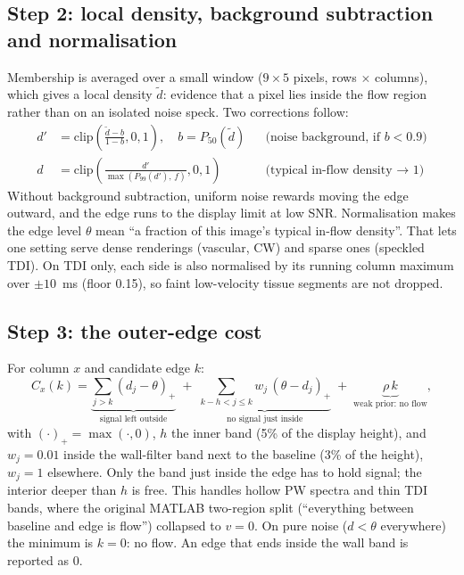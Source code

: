 \documentclass[10pt,a4paper]{article}
\begin{document}
\subsection{Step 2: local density, background subtraction and normalisation}
Membership is averaged over a small window ($9\times5$ pixels, rows $\times$ columns), which gives a local density
$\tilde d$: evidence that a pixel lies inside the flow region rather than on an isolated noise speck. Two corrections follow:
\begin{align}
d' &= \mathrm{clip}\!\left(\frac{\tilde d - b}{1-b},0,1\right), \quad b = P_{50}(\tilde d) && \text{(noise background, if $b<0.9$)}\\
d &= \mathrm{clip}\!\left(\frac{d'}{\max(P_{99}(d'),\,f)},0,1\right) && \text{(typical in-flow density $\to$ 1)}
\end{align}
Without background subtraction, uniform noise rewards moving the edge outward, and the edge runs to the display limit at
low SNR. Normalisation makes the edge level $\theta$ mean ``a fraction of this image's typical in-flow density''.
That lets one setting serve dense renderings (vascular, CW) and sparse ones (speckled TDI). On TDI only, each side is also
normalised by its running column maximum over $\pm10$~ms (floor 0.15), so faint low-velocity tissue
segments are not dropped.

\subsection{Step 3: the outer-edge cost}
For column $x$ and candidate edge $k$:
\begin{equation}
C_x(k) = \underbrace{\sum_{j>k} (d_j-\theta)_+}_{\text{signal left outside}}
\;+\; \underbrace{\sum_{k-h<j\le k} w_j\,(\theta-d_j)_+}_{\text{no signal just inside}}
\;+\; \underbrace{\rho\,k}_{\text{weak prior: no flow}},
\end{equation}
with $(\cdot)_+=\max(\cdot,0)$, $h$ the inner band (5\% of the display height), and $w_j=0.01$ inside the wall-filter
band next to the baseline (3\% of the height), $w_j=1$ elsewhere. Only the band just inside the edge has to hold
signal; the interior deeper than $h$ is free. This handles hollow PW spectra and thin TDI bands, where the
original MATLAB two-region split (``everything between baseline and edge is flow'') collapsed to $v=0$. On pure noise
($d<\theta$ everywhere) the minimum is $k=0$: no flow. An edge that ends inside the wall band is reported as 0.
\end{document}
